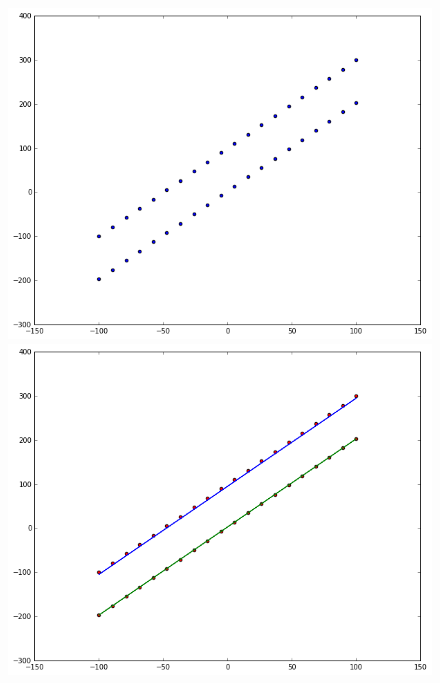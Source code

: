\begin{figure}[H]
   \centering
   \includegraphics[scale=0.15]{figures/two_ground_truth.png}
   \includegraphics[scale=0.15]{figures/two_result.png}
 \end{figure}

